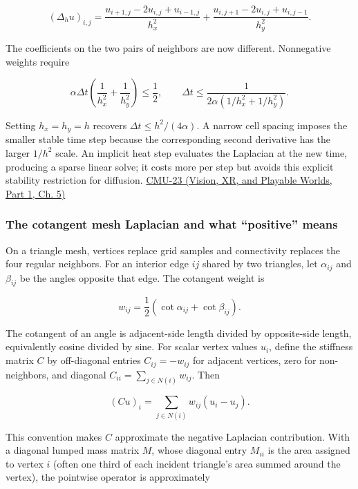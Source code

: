 \[
(\Delta_hu)_{i,j}=
\frac{u_{i+1,j}-2u_{i,j}+u_{i-1,j}}{h_x^2}
+\frac{u_{i,j+1}-2u_{i,j}+u_{i,j-1}}{h_y^2}.
\]

The coefficients on the two pairs of neighbors are now different. Nonnegative weights require

\[
\alpha\Delta t\left(\frac{1}{h_x^2}+\frac{1}{h_y^2}\right)\le\frac12,
\qquad
\Delta t\le\frac{1}{2\alpha(1/h_x^2+1/h_y^2)}.
\]

Setting \(h_x=h_y=h\) recovers \(\Delta t\le h^2/(4\alpha)\). A narrow cell spacing imposes the smaller stable time step because the corresponding second derivative has the larger \(1/h^2\) scale. An implicit heat step evaluates the Laplacian at the new time, producing a sparse linear solve; it costs more per step but avoids this explicit stability restriction for diffusion. \href{../07-Vision-XR-and-Playable-Worlds-P01/main.pdf\#nameddest=04-visual-computing-ii-ch036-cmu-23---physically-based-animation-and-pdes}{CMU-23 (Vision, XR, and Playable Worlds, Part 1, Ch. 5)}

\subsubsection{The cotangent mesh Laplacian and what ``positive'' means}\label{04-visual-computing-ii-ch030-the-cotangent-mesh-laplacian-and-what-positive-means}

\hypertarget{04-visual-computing-ii-ch030-the-cotangent-mesh-laplacian-and-what-positive-means}{}

On a triangle mesh, vertices replace grid samples and connectivity replaces the four regular neighbors. For an interior edge \(ij\) shared by two triangles, let \(\alpha_{ij}\) and \(\beta_{ij}\) be the angles opposite that edge. The cotangent weight is

\[
w_{ij}=\frac12(\cot\alpha_{ij}+\cot\beta_{ij}).
\]

The cotangent of an angle is adjacent-side length divided by opposite-side length, equivalently cosine divided by sine. For scalar vertex values \(u_i\), define the stiffness matrix \(C\) by off-diagonal entries \(C_{ij}=-w_{ij}\) for adjacent vertices, zero for non-neighbors, and diagonal \(C_{ii}=\sum_{j\in N(i)}w_{ij}\). Then

\[
(Cu)_i=\sum_{j\in N(i)}w_{ij}(u_i-u_j).
\]

This convention makes \(C\) approximate the negative Laplacian contribution. With a diagonal lumped mass matrix \(M\), whose diagonal entry \(M_{ii}\) is the area assigned to vertex \(i\) (often one third of each incident triangle's area summed around the vertex), the pointwise operator is approximately

